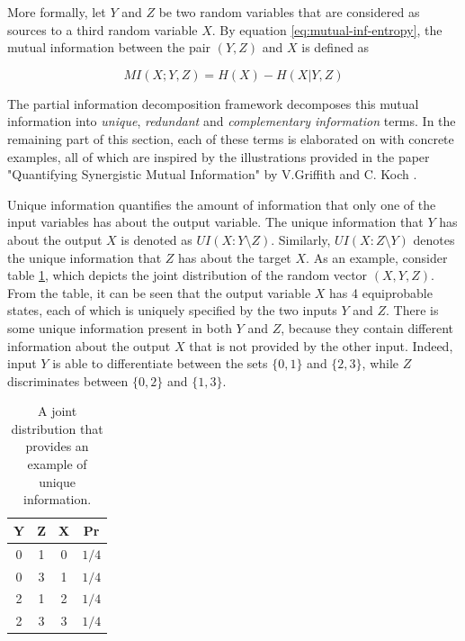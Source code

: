 \documentclass[12pt]{article}
\begin{document}
More formally, let $Y$ and $Z$ be two random variables that are considered as sources to a third random variable $X$. By equation \ref{eq:mutual-inf-entropy}, the mutual information between the pair $(Y,Z)$ and $X$ is defined as 

$$MI(X;Y,Z) = H(X) - H(X|Y,Z)$$

The partial information decomposition framework decomposes this mutual information into \textit{unique}, \textit{redundant} and \textit{complementary information} terms. In the remaining part of this section, each of these terms is elaborated on with concrete examples, all of which are inspired by the illustrations provided in the paper "Quantifying Synergistic Mutual Information" by V.Griffith and C. Koch \cite{pid-synergy}.

Unique information quantifies the amount of information that only one of the input variables has about the output variable. The unique information that $Y$ has about the output $X$ is denoted as $UI(X:Y \setminus Z)$. Similarly, $UI(X:Z \setminus Y)$ denotes the unique information that $Z$ has about the target $X$. As an example, consider table \ref{table:1}, which depicts the joint distribution of the random vector $(X,Y,Z)$. From the table, it can be seen that the output variable $X$ has 4 equiprobable states, each of which is uniquely specified by the two inputs $Y$ and $Z$. There is some unique information present in both $Y$ and $Z$, because they contain different information about the output $X$ that is not provided by the other input. Indeed, input $Y$ is able to differentiate between the sets $\{0,1\}$ and $\{2,3\}$, while $Z$ discriminates between $\{0, 2\}$ and $\{1,3\}$.

\begin{table}[h!]
\centering
\caption{A joint distribution that provides an example of unique information.}
\begin{tabular}{|c c |c|c|}
	\hline
	Y & Z & X & Pr\\ 
	\hline
	0 & 1 & 0 & $1/4$ \\
	0 & 3 & 1 & $1/4$ \\
	2 & 1 & 2 & $1/4$ \\
	2 & 3 & 3 & $1/4$ \\
	\hline
\end{tabular}
\label{table:1}
\end{table}
\end{document}
